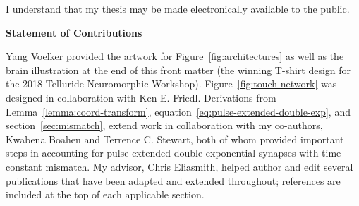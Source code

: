 \bigskip

\noindent
I understand that my thesis may be made electronically available to
the public.

\cleardoublepage

{}
\begin{center}\textbf{Statement of Contributions}\end{center}

\noindent
Yang Voelker provided the artwork for Figure~\ref{fig:architectures} as well as the brain illustration at the end of this front matter (the winning T-shirt design for the 2018 Telluride Neuromorphic Workshop).
Figure~\ref{fig:touch-network} was designed in collaboration with Ken E. Friedl.
Derivations from Lemma~\ref{lemma:coord-transform}, equation~\ref{eq:pulse-extended-double-exp}, and section~\ref{sec:mismatch}, extend work in collaboration with my co-authors, Kwabena Boahen and Terrence C. Stewart, both of whom provided important steps in accounting for pulse-extended double-exponential synapses with time-constant mismatch.
My advisor, Chris Eliasmith, helped author and edit several publications that have been adapted and extended throughout; references are included at the top of each applicable section.

\cleardoublepage
